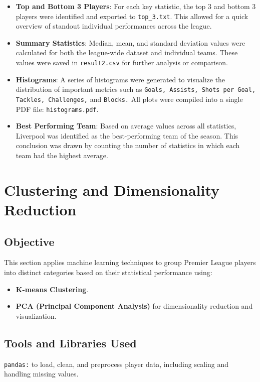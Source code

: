 \documentclass[12pt,a4paper]{report}
\begin{document}
\begin{itemize}
    \item \textbf{Top and Bottom 3 Players}: For each key statistic, the top 3 and bottom 3 players were identified and exported to \texttt{top\_3.txt}. This allowed for a quick overview of standout individual performances across the league.
    
    \item \textbf{Summary Statistics}: Median, mean, and standard deviation values were calculated for both the league-wide dataset and individual teams. These values were saved in \texttt{result2.csv} for further analysis or comparison.
    
    \item \textbf{Histograms}: A series of histograms were generated to visualize the distribution of important metrics such as \texttt{Goals, Assists, Shots per Goal, Tackles, Challenges,} and \texttt{Blocks.} All plots were compiled into a single PDF file: \texttt{histograms.pdf}.
    
    \item \textbf{Best Performing Team}: Based on average values across all statistics, Liverpool was identified as the best-performing team of the season. This conclusion was drawn by counting the number of statistics in which each team had the highest average.
\end{itemize}

\chapter{Clustering and \mbox{Dimensionality} Reduction}
\section{Objective}
This section applies machine learning techniques to group Premier League players into distinct categories based on their statistical performance using:
\begin{itemize}
    \item \textbf{K-means Clustering}.
    \item \textbf{PCA (Principal Component Analysis)} for dimensionality reduction and visualization.
\end{itemize}

\section{Tools and Libraries Used}
   \texttt{pandas:} to load, clean, and preprocess player data, including scaling and handling missing values.
   
\end{document}
